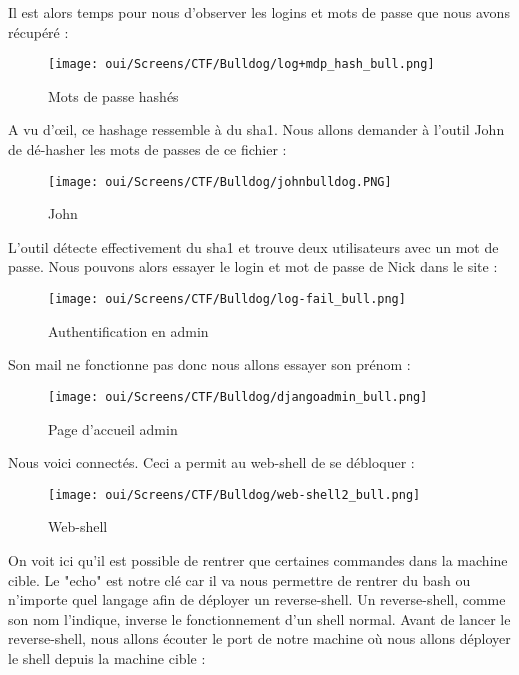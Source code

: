 Il est alors temps pour nous d’observer les logins et mots de passe que nous avons récupéré :

\begin{figure}[htp!]
  \centering
  \setlength\figureheight{7cm}
  \setlength\figurewidth{9cm}
  \texttt{[image: oui/Screens/CTF/Bulldog/log+mdp\_hash\_bull.png]}
  \caption{Mots de passe hashés}
  \label{fig:courbe-tikz}
\end{figure}

A vu d’œil, ce hashage ressemble à du sha1. Nous allons demander à l’outil John de dé-hasher les mots de passes de ce fichier :

\begin{figure}[htp!]
  \centering
  \setlength\figureheight{7cm}
  \setlength\figurewidth{9cm}
  \texttt{[image: oui/Screens/CTF/Bulldog/johnbulldog.PNG]}
  \caption{John}
  \label{fig:courbe-tikz}
\end{figure}

L’outil détecte effectivement du sha1 et trouve deux utilisateurs avec un mot de passe.
Nous pouvons alors essayer le login et mot de passe de Nick dans le site :

\begin{figure}[htp!]
  \centering
  \setlength\figureheight{7cm}
  \setlength\figurewidth{9cm}
  \texttt{[image: oui/Screens/CTF/Bulldog/log-fail\_bull.png]}
  \caption{Authentification en admin}
  \label{fig:courbe-tikz}
\end{figure}

Son mail ne fonctionne pas donc nous allons essayer son prénom :

\begin{figure}[htp!]
  \centering
  \setlength\figureheight{7cm}
  \setlength\figurewidth{9cm}
  \texttt{[image: oui/Screens/CTF/Bulldog/djangoadmin\_bull.png]}
  \caption{Page d'accueil admin}
  \label{fig:courbe-tikz}
\end{figure}

Nous voici connectés. Ceci a permit au web-shell de se débloquer :

\begin{figure}[htp!]
  \centering
  \setlength\figureheight{7cm}
  \setlength\figurewidth{9cm}
  \texttt{[image: oui/Screens/CTF/Bulldog/web-shell2\_bull.png]}
  \caption{Web-shell}
  \label{fig:courbe-tikz}
\end{figure}

On voit ici qu’il est possible de rentrer que certaines commandes dans la machine cible. Le "echo" est notre clé car il va nous permettre de rentrer du bash ou n’importe quel langage afin de déployer un reverse-shell.
Un reverse-shell, comme son nom l’indique, inverse le fonctionnement d’un shell normal.
Avant de lancer le reverse-shell, nous allons écouter le port de notre machine où nous allons déployer le shell depuis la machine cible :

